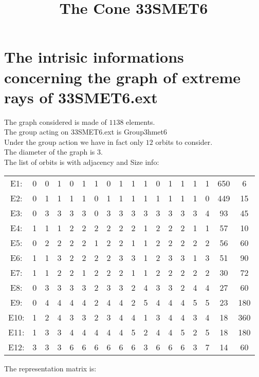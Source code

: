 \documentclass[12pt]{article}
\title{The Cone 33SMET6}
\begin{document}
\maketitle
\section{The intrisic informations concerning the graph of extreme rays of 33SMET6.ext}
The graph considered is made of $1138$ elements.\\
The group acting on 33SMET6.ext is Group3hmet6\\
Under the group action we have in fact only $12$ orbits to consider.\\
The diameter of the graph is $3$.\\
The list of orbits is with adjacency and Size info:
\begin{center}
\scriptsize
\begin{tabular}{cccccccccccccccc|c|c}
E1:&0&0&1&0&1&1&0&1&1&1&0&1&1&1&1&650&6\\
E2:&0&1&1&1&1&0&1&1&1&1&1&1&1&1&0&449&15\\
E3:&0&3&3&3&3&0&3&3&3&3&3&3&3&3&4&93&45\\
E4:&1&1&1&2&2&2&2&2&2&1&2&2&2&1&1&57&10\\
E5:&0&2&2&2&2&1&2&2&1&1&2&2&2&2&2&56&60\\
E6:&1&1&3&2&2&2&2&3&3&1&2&3&3&1&3&51&90\\
E7:&1&1&2&2&1&2&2&2&1&1&2&2&2&2&2&30&72\\
E8:&0&3&3&3&3&2&3&3&2&4&3&3&2&4&4&27&60\\
E9:&0&4&4&4&4&2&4&4&2&5&4&4&4&5&5&23&180\\
E10:&1&2&4&3&3&2&3&4&4&1&3&4&4&3&4&18&360\\
E11:&1&3&3&4&4&4&4&4&5&2&4&4&5&2&5&18&180\\
E12:&3&3&3&6&6&6&6&6&6&3&6&6&6&3&7&14&60\\
\end{tabular}
\end{center}
The representation matrix is:
\end{document}
